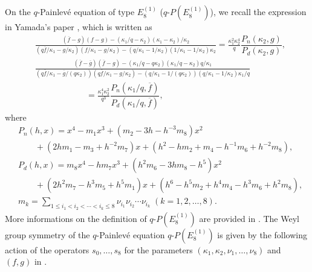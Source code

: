 \documentclass[12pt]{amsart}
\numberwithin{equation}{section}
\theoremstyle{definition}
\begin{document}
\subsection{} \label{sec:WE8}
On the $q$-Painlev\'e equation of type $E^{(1)}_{8} $ ($q$-$P(E^{(1)}_{8})$), we recall the expression in Yamada's paper \cite{Y}, which is written as
\begin{align}
& \frac{(\overline{f}-g)(f-g)-(\kappa _1/q-\kappa _2)(\kappa _1-\kappa _2)/ \kappa _2}
{( q \overline{f}/ \kappa _1-g/\kappa _2)(f/\kappa _1-g/\kappa _2)
-(q/\kappa _1-1/\kappa _2)(1/\kappa _1-1/\kappa _2)\kappa _2}
=\frac{\kappa _1^2\kappa _2^4}{q}\dfrac{P_n(\kappa _2,g)}{P_d(\kappa _2,g)}, \label{eq:qPE18} \\
& \frac{(\overline{f}-\overline{g})(\overline{f}-g)-(\kappa _1/q- q \kappa _2 )(\kappa _1/q-\kappa _2)q/\kappa _1}
{(q \overline{f}/\kappa _1-\overline{g}/(q \kappa _2))
(q \overline{f}/\kappa _1-g/\kappa _2)-(q/\kappa _1- 1/(q \kappa _2))(q/\kappa _1-1/\kappa _2)\kappa _1/q} \nonumber \\
& \qquad \qquad \qquad =\frac{\kappa _1^4\kappa _2^2}{q^3}\dfrac{P_n(\kappa _1/q,\overline{f})}{P_d(\kappa _1/q ,\overline{f})}, \nonumber 
\end{align}
where
\begin{align}
& P_n(h,x)= x^4-m_1 x^3+(m_2-3h -h^{-3}m_8) x^2 \\
& \qquad +(2hm_1-m_3+h^{-2}m_7) x +(h^2 - h m_2+m_4-h^{-1}m_6+h^{-2}m_8),  \nonumber \\
& P_d(h,x)= m_8 x^4-hm_7 x^3+(h^2m_6-3hm_8 - h^{5} ) x^2  \nonumber \\
& \qquad +(2h^2m_7-h^3m_5+h^{5}m_1) x +(h^6 -h^5m_2+h^4m_4-h^{3}m_6+h^{2}m_8),  \nonumber \\
& m_k = \sum _{1\leq i_1 < i_2 < \cdots < i_k \leq 8} \nu _{i_1} \nu _{i_2} \cdots \nu _{i_k} \; (k=1,2,\dots ,8) .  \nonumber 
\end{align}
More informations on the definition of $q$-$P(E^{(1)}_8 )$ are provided in \cite{Y}.
The Weyl group symmetry of the $q$-Painlev\'e equation $q$-$P(E^{(1)}_8 )$ is given by the following action of the operators $s_0, \dots ,s_8$ for the parameters $(\kappa_{1}, \kappa_{2}, \nu_{1}, \dots , \nu_{8}) $ and $(f, g) $ in \cite{Y,KNY}.
\end{document}
